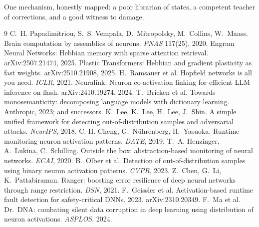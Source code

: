 \documentclass[11pt]{article}
\begin{document}
One mechanism, honestly mapped: a poor librarian of states, a competent teacher
of corrections, and a good witness to damage.

\begin{thebibliography}{9}
\small
{} C.~H. Papadimitriou, S.~S. Vempala, D.~Mitropolsky,
M.~Collins, W.~Maass. Brain computation by assemblies of neurons.
\emph{PNAS} 117(25), 2020.
 Engram Neural Networks: Hebbian memory with sparse attention
retrieval. arXiv:2507.21474, 2025.
 Plastic Transformers: Hebbian and gradient plasticity as
fast weights. arXiv:2510.21908, 2025.
 H.~Ramsauer et al. Hopfield networks is all you need.
\emph{ICLR}, 2021.
 Neuralink: Neuron co-activation linking for efficient
LLM inference on flash. arXiv:2410.19274, 2024.
 T.~Bricken et al. Towards monosemanticity: decomposing language
models with dictionary learning. Anthropic, 2023; and successors.
 K.~Lee, K.~Lee, H.~Lee, J.~Shin. A simple unified framework for
detecting out-of-distribution samples and adversarial attacks.
\emph{NeurIPS}, 2018.
 C.-H. Cheng, G.~N\"uhrenberg, H.~Yasuoka. Runtime monitoring
neuron activation patterns. \emph{DATE}, 2019.
 T.~A. Henzinger, A.~Lukina, C.~Schilling. Outside the
box: abstraction-based monitoring of neural networks. \emph{ECAI}, 2020.
 B.~Olber et al. Detection of out-of-distribution samples
using binary neuron activation patterns. \emph{CVPR}, 2023.
 Z.~Chen, G.~Li, K.~Pattabiraman. Ranger: boosting error
resilience of deep neural networks through range restriction. \emph{DSN},
2021.
 F.~Geissler et al. Activation-based runtime fault
detection for safety-critical DNNs. 2023. arXiv:2310.20349.
 F.~Ma et al. Dr.~DNA: combating silent data corruption in
deep learning using distribution of neuron activations. \emph{ASPLOS}, 2024.
\end{thebibliography}
\end{document}
